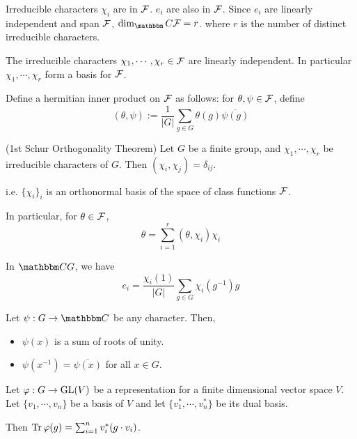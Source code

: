 \documentclass{article}
\begin{document}
\begin{proposition}
  Irreducible characters \(\chi_i\) are in \(\mathcal{F}\).
  \(e_i\) are also in \(\mathcal{F}\).
  Since \(e_i\) are linearly independent and span \(\mathcal{F}\),
  \(\dim_\bbC \calF = r\).
  where \(r\) is the number of distinct irreducible characters.
\end{proposition}

\begin{theorem}
  The irreducible characters \(\chi_1, \cdots, \chi_r \in \mathcal{F}\)
  are linearly independent.
  In particular \(\chi_1, \cdots, \chi_r\) form a basis for \(\mathcal{F}\).
\end{theorem}

\begin{definition}
  Define a hermitian inner product on \(\mathcal{F}\) as follows:
  for \(\theta, \psi \in \mathcal{F}\),
  define
  \[(\theta, \psi) := \frac{1}{|G|} \sum_{g \in G} \theta(g) \overline{\psi(g)}\]
\end{definition}

\begin{theorem}(1st Schur Orthogonality Theorem)
  Let \(G\) be a finite group, and \(\chi_1, \cdots, \chi_r\) be irreducible characters of \(G\).
  Then \((\chi_i, \chi_j) = \delta_{ij}\).

  i.e.  \(\{\chi_i\}_i\) is an orthonormal basis of the space of class functions \(\mathcal{F}\).

  In particular, for \(\theta \in \mathcal{F}\),
  \[\theta = \sum_{i=1}^r (\theta, \chi_i) \chi_i\]
\end{theorem}

\begin{lemma}
  In \(\bbC G\), we have
  \[e_i = \frac{\chi_i(1)}{|G|} \sum_{g \in G} \chi_i(g^{-1}) g\]
\end{lemma}

\begin{lemma}
  Let \(\psi: G \to \bbC\) be any character.
  Then,
  \begin{itemize}
  \item \(\psi(x)\) is a sum of roots of unity.
  \item \(\psi(x^{-1}) = \overline{\psi(x)}\) for all \(x \in G\).
  \end{itemize}
\end{lemma}

\begin{theorem}
  Let \(\varphi: G \to \textnormal{GL}(V)\) be a representation
  for a finite dimensional vector space \(V\).
  Let \(\{v_1, \cdots, v_n\}\) be a basis of \(V\)
  and let \(\{v_1^*, \cdots, v_n^*\}\) be its dual basis.

  Then \(\operatorname{Tr}\varphi(g) = \sum_{i=1}^n v^*_i(g \cdot v_i)\).
\end{theorem}
\end{document}
